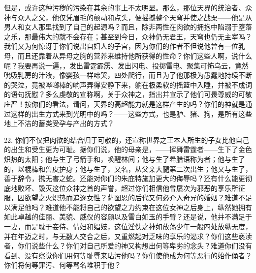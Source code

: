 但是，或许这种污秽的污染在其余的事上不太明显。那么，那位天界的统治者、众神与众人之父，他仅凭眉毛的颤动和点头，便摇撼整个天穹并使之战栗——他是从男人和女人那里找到了自己的起源吗？而且，除非两性在肉欲的拥抱中陷溺于堕落之乐，那最伟大的就不会存在；甚至到今日，众神仍无君王，天穹也仍无主宰吗？我们又为何惊讶于你们说出自妇人的子宫，因为你们的作者不但说他曾有一位乳母，而且还靠着从异母之胸的营养来维持他所获得的性命？你们这些人啊，说什么呢？我要再说一遍，，发出雷霆霹雳、发出闪电、投掷雷电、聚集可怖乌云，竟然吮吸乳房的汁液，像婴孩一样啼哭，四处爬行，而且为了他那极为愚蠢地持续不断的哭泣，竟被哗啷棒的响声弄得安静下来，躺在极柔软的摇篮中入睡，并被不成词的语句抚慰？多么虔敬的宣称啊，关于众神之，指出并宣示了他们可畏尊威的可敬庄严！按你们的看法，请问，天界的高超能力就是这样产生的吗？你们的神就是通过这样的出生方式来到光明中的吗？——这些方式，也是驴、猪、狗，是所有这些地上不洁的蓄类受孕与产出的方式？\par

22. 你们不仅把肉欲的结合归于可敬的，还宣称世界之王本人所生的子女比他自己的出生和受生更为可耻。据你们说，他的母亲是，——挥舞雷霆者——生下了金色炽热的太阳；他与生了弓箭手和，唤醒林间；他与生了希腊语称为者；他与生了的，以棍棒和兽皮护身；他与生了，又名，从父亲大腿第二次出生；他又与生了，善于辞令，携无害之蛇。还能对你们的朱庇特施加更大的侮辱吗？还有什么能更彻底地败坏、毁灭这位众神之首的声誉，超过你们相信他曾屡次为邪恶的享乐所征服，因欲望之火炽热而追逐女性？萨图恩的后代又何必介入奇异的婚姻？难道不足以满足他吗？难道他不能将自己的欲望之力约束在这位女神之后身上，纵然她拥有如此卓越的佳丽、美貌、威仪的容颜以及雪白如玉的手臂？还是说，他并不满足于一妻，而是耽于妾侍、情妇和娼妓，这位淫佚之神如放荡少年一般四处放纵无度，并在年迈之时，与无数人交合之后，又重燃起对乏味的享乐的渴求？你们这些亵渎者，你们说些什么？你们对自己所爱的神又构想出何等卑劣的念头？难道你们没有看到、没有察觉你们用何等耻辱来玷污他吗？你们使他成为何等恶行的始作俑者？你们将何等罪污、何等骂名堆积于他？\par

